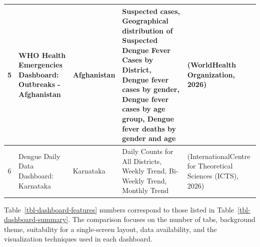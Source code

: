 \documentclass[
]{article}
\begin{document}
\begin{longtable}{|c|p{3.3cm}|p{2.8cm}|p{4.7cm}|p{2.8cm}|}
5 & WHO Health Emergencies Dashboard: Outbreaks - Afghanistan & Afghanistan & Suspected cases, Geographical distribution of Suspected Dengue Fever Cases by District, Dengue fever cases by gender, Dengue fever cases by age group, Dengue fever deaths by gender and age & (WorldHealth Organization, 2026)
 \\
\hline

6 & Dengue Daily Data Dashboard: Karnataka & Karnataka & Daily Counts for All Districts, Weekly Trend, Bi-Weekly Trend, Monthly Trend & (InternationalCentre for Theoretical Sciences (ICTS), 2026)
 \\
\hline

\end{longtable}

Table~\ref{tbl-dashboard-features} numbers correspond to those listed in
Table~\ref{tbl-dashboard-summary}. The comparison focuses on the number
of tabs, background theme, suitability for a single-screen layout, data
availability, and the visualization techniques used in each dashboard.
\end{document}
